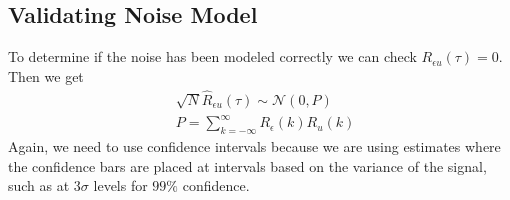 \subsection{Validating Noise Model}
To determine if the noise has been modeled correctly we can check $R_{\epsilon u}(\tau)=0$.
Then we get
\begin{align*}
&\sqrt{N}\hat{R}_{\epsilon u}(\tau) \sim \mathcal{N}(0,P) \\
&P = \sum_{k=-\infty}^\infty R_\epsilon(k)R_u(k)
\end{align*}
Again, we need to use confidence intervals because we are using estimates where the confidence bars are placed at intervals based on the variance of the signal, such as at $3\sigma$ levels for $99\%$ confidence.
